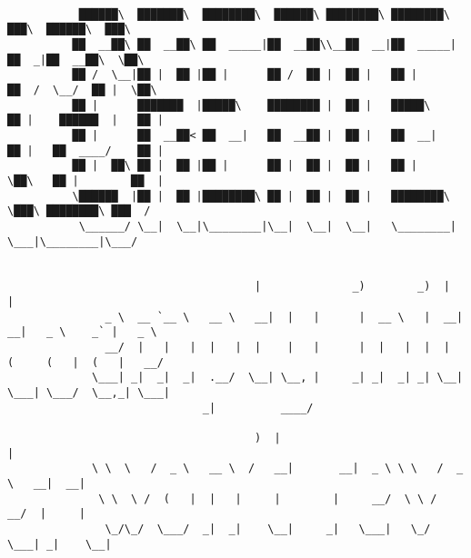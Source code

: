 \documentclass[varwidth=\maxdimen,margin=0.5cm,multi={verbatim}]{standalone}
\begin{document}
\begin{verbatim}

           ██████\  ███████\  ████████\  ██████\ ████████\ ████████\      ███\  ██████\  ███\
          ██  __██\ ██  __██\ ██  _____|██  __██\\__██  __|██  _____|    ██  _|██  __██\  \██\
          ██ /  \__|██ |  ██ |██ |      ██ /  ██ |  ██ |   ██ |         ██  /  \__/  ██ |  \██\
          ██ |      ███████  |█████\    ████████ |  ██ |   █████\       ██ |    ██████  |   ██ |
          ██ |      ██  __██< ██  __|   ██  __██ |  ██ |   ██  __|      ██ |   ██  ____/    ██ |
          ██ |  ██\ ██ |  ██ |██ |      ██ |  ██ |  ██ |   ██ |         \██\   ██ |        ██  |
          \██████  |██ |  ██ |████████\ ██ |  ██ |  ██ |   ████████\     \███\ ████████\ ███  /
           \______/ \__|  \__|\________|\__|  \__|  \__|   \________|      \___|\________|\___/


                                      |              _)        _)  |                         |
               _ \  __ `__ \   __ \   __|  |   |      |  __ \   |  __|       __|   _ \    _` |   _ \
               __/  |   |   |  |   |  |    |   |      |  |   |  |  |        (     (   |  (   |   __/
             \___| _|  _|  _|  .__/  \__| \__, |     _| _|  _| _| \__|     \___| \___/  \__,_| \___|
                              _|          ____/

                                      )  |                                      |
             \ \  \   /  _ \   __ \  /   __|       __|  _ \ \ \   /  _ \   __|  __|
              \ \  \ /  (   |  |   |     |        |     __/  \ \ /   __/  |     |
               \_/\_/  \___/  _|  _|    \__|     _|   \___|   \_/  \___| _|    \__|



\end{verbatim}
\end{document}
